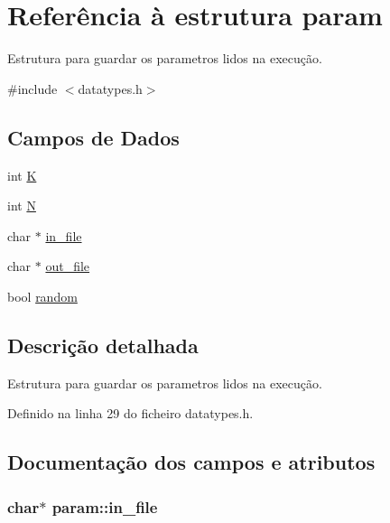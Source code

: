 \hypertarget{structparam}{}\section{Referência à estrutura param}
\label{structparam}


Estrutura para guardar os parametros lidos na execução.  




{\ttfamily \#include $<$datatypes.\+h$>$}

\subsection*{Campos de Dados}
\begin{DoxyCompactItemize}
\item 
int \hyperlink{structparam_a145e2314d8aa9d83d73e8e3ef75f22ce}{K}
\item 
int \hyperlink{structparam_aeaec5e6ee20fdc326936bd7b458c9a6b}{N}
\item 
char $\ast$ \hyperlink{structparam_a8b39b57bcf6a5a2847aeeb5fe962268e}{in\+\_\+file}
\item 
char $\ast$ \hyperlink{structparam_aa3f61385f1113666058489f5f8629e89}{out\+\_\+file}
\item 
bool \hyperlink{structparam_a891751e85aa3c137b33e7bf1e9748230}{random}
\end{DoxyCompactItemize}


\subsection{Descrição detalhada}
Estrutura para guardar os parametros lidos na execução. 

Definido na linha 29 do ficheiro datatypes.\+h.



\subsection{Documentação dos campos e atributos}
\subsubsection[{\texorpdfstring{in\+\_\+file}{in_file}}]{\setlength{\rightskip}{0pt plus 5cm}char$\ast$ param\+::in\+\_\+file}\hypertarget{structparam_a8b39b57bcf6a5a2847aeeb5fe962268e}{}\label{structparam_a8b39b57bcf6a5a2847aeeb5fe962268e}


